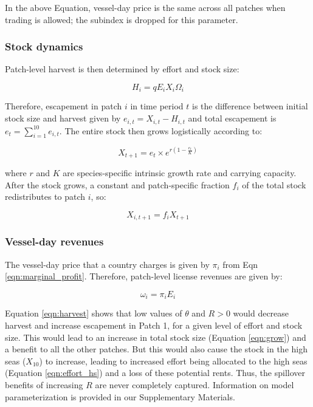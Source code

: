 \documentclass[12pt]{article}
\begin{document}
\noindent In the above Equation, vessel-day price is the same across all patches when trading is allowed; the subindex is dropped for this parameter.

\subsubsection{Stock dynamics}

Patch-level harvest is then determined by effort and stock size:

\begin{equation}
H_i = qE_iX_i\Omega_i
\label{eqn:harvest}
\end{equation}


\noindent Therefore, escapement in patch $i$ in time period $t$ is the difference between initial stock size and harvest given by $e_{i,t} = X_{i,t} - H_{i,t}$ and total escapement is $e_t=\sum_{i=1}^{10}e_{i,t}$. The entire stock then grows logistically according to:

\begin{equation}
X_{t+1} = e_t \times  e^{r \left(1 - \frac{e_t}{K} \right)}
\label{eqn:grow}
\end{equation}

\noindent where $r$ and $K$ are species-specific intrinsic growth rate and carrying capacity. After the stock grows, a constant and patch-specific fraction $f_i$ of the total stock redistributes to patch $i$, so:

\begin{equation}
X_{i,t+1} = f_iX_{t+1}
\label{eqn:disperse}
\end{equation}

\subsubsection{Vessel-day revenues}

The vessel-day price that a country charges is given by $\pi_i$ from Eqn \ref{eqn:marginal_profit}. Therefore, patch-level license revenues are given by:

\begin{equation}
\omega_i = \pi_iE_i
\label{eqn:license_revenue}
\end{equation}

\noindent Equation \ref{eqn:harvest} shows that low values of $\theta$ and $R > 0$ would decrease harvest and increase escapement in Patch 1, for a given level of effort and stock size. This would lead to an increase in total stock size (Equation \ref{eqn:grow}) and a benefit to all the other patches. But this would also cause the stock in the high seas ($X_{10}$) to increase, leading to increased effort being allocated to the high seas (Equation \ref{eqn:effort_hs}) and a loss of these potential rents. Thus, the spillover benefits of increasing $R$ are never completely captured. Information on model parameterization is provided in our Supplementary Materials.
\end{document}
